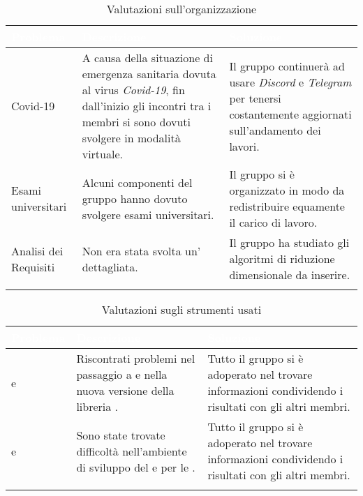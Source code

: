 \begin{itemize}
\renewcommand{\arraystretch}{1.5}
\centering
\begin{longtable}{C{2.5cm} C{6cm} C{5cm}}
\textcolor{white}{\textbf{Problema}} &
\textcolor{white}{\textbf{Descrizione}} &	
\textcolor{white}{\textbf{Soluzione}} \\	
\endhead

Covid-19 &
A causa della situazione di emergenza sanitaria dovuta al virus \textit{Covid-19}, fin dall'inizio gli incontri tra i membri si sono dovuti svolgere in modalità virtuale.&
Il gruppo continuerà ad usare \textit{Discord} e \textit{Telegram} per tenersi costantemente aggiornati sull'andamento dei lavori. \\

Esami universitari & 
Alcuni componenti del gruppo hanno dovuto svolgere esami universitari. &
Il gruppo si è organizzato in modo da redistribuire equamente il carico di lavoro. \\

Analisi dei Requisiti & 
Non era stata svolta un'\AdR{} dettagliata. &
Il gruppo ha studiato gli algoritmi di riduzione dimensionale da inserire. \\

 \caption{Valutazioni sull'organizzazione}
\end{longtable}

\renewcommand{\arraystretch}{1.5}
\centering
\begin{longtable}{C{2.5cm} C{6cm} C{5cm}}
\textcolor{white}{\textbf{Problema}} &
\textcolor{white}{\textbf{Descrizione}} &	
\textcolor{white}{\textbf{Soluzione}} \\	
\endhead

 e  & 
Riscontrati problemi nel passaggio a  e nella nuova versione della libreria . &
Tutto il gruppo si è adoperato nel trovare informazioni condividendo i risultati con gli altri membri.  \\

 e  & 
Sono state trovate difficoltà nell'ambiente di sviluppo del  e per le . &
Tutto il gruppo si è adoperato nel trovare informazioni condividendo i risultati con gli altri membri.   \\

 \caption{Valutazioni sugli strumenti usati}
\end{longtable}

\end{itemize}

\newpage